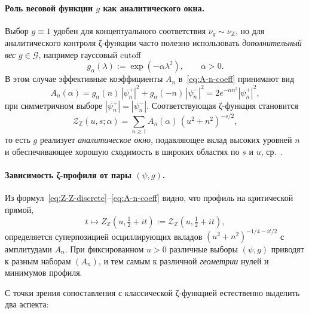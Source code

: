 \documentclass{article}
\numberwithin{equation}{section}
\theoremstyle{plain}
\theoremstyle{definition}
\theoremstyle{remark}
\def\alpha{α}\def\beta{β}\def\gamma{γ}\def\Gamma{Γ}%
\begin{document}
\paragraph{Роль весовой функции \texorpdfstring{$g$}{g} как аналитического окна.}
Выбор \(g\equiv 1\) удобен для концептуального соответствия
\(\nu_g\sim\nu_{\mathbb Z}\), но для аналитического контроля ζ-функции
часто полезно использовать \emph{дополнительный вес} \(g\in\mathcal G\),
например гауссовый cutoff
\begin{equation}
\label{eq:gaussian-g}
g_\alpha(\lambda)
:= \exp(-\alpha\lambda^2),
\qquad \alpha>0.
\end{equation}
В этом случае эффективные коэффициенты
\(A_n\) в~\eqref{eq:A-n-coeff} принимают вид
\begin{equation}
\label{eq:A-n-gaussian}
A_n(\alpha)
=
g_\alpha(n)\,|\psi_n^+|^2 + g_\alpha(-n)\,|\psi_n^-|^2
=
2e^{-\alpha n^2}|\psi_n^+|^2,
\end{equation}
при симметричном выборе \(|\psi_n^+|=|\psi_n^-|\). Соответствующая
ζ-функция становится
\begin{equation}
\label{eq:Z-Z-gaussian}
\mathcal Z_{\mathbb Z}(u,s;\alpha)
=
\sum_{n\ge 1} A_n(\alpha)\,(u^2+n^2)^{-s/2},
\end{equation}
то есть \(g\) реализует \emph{аналитическое окно}, подавляющее вклад
высоких уровней \(n\) и обеспечивающее хорошую сходимость в широких
областях по \(s\) и \(u\), ср.~\cite{Kirsten2001,Elizalde1995}.

\paragraph{Зависимость ζ-профиля от пары \texorpdfstring{$(\psi,g)$}{(psi,g)}.}
Из формул~\eqref{eq:Z-Z-discrete}–\eqref{eq:A-n-coeff} видно, что профиль
на критической прямой,
\begin{equation}
\label{eq:profile-def}
t\mapsto
Z_{\mathbb Z}(u,\tfrac12+it)
:=
\mathcal Z_{\mathbb Z}(u,\tfrac12+it),
\end{equation}
определяется суперпозицией осциллирующих вкладов
\((u^2+n^2)^{-1/4-it/2}\) с амплитудами \(A_n\). При фиксированном \(u>0\)
различные выборы \((\psi,g)\) приводят к разным наборам \((A_n)\),
и тем самым к различной \emph{геометрии} нулей и минимумов профиля.

С точки зрения сопоставления с классической ζ-функцией естественно
выделить два аспекта:
\end{document}
